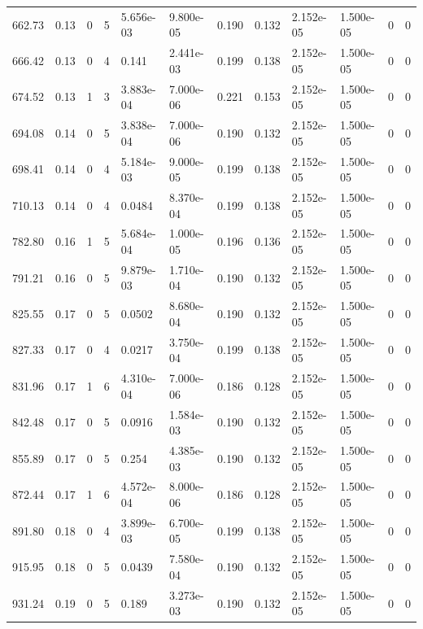 \documentclass[preview]{standalone}
\begin{document}
{{{\begin{tabular}{L{1.2cm}C{1.2cm} C{0.3cm}C{0.5cm} C{1.4cm}C{1.4cm} C{1.4cm}C{1.4cm} C{1.6cm}C{1.6cm} C{1.6cm}C{1.6cm}}
  662.73  &  0.13  & 0     &  5 &  5.656e-03  & 9.800e-05  &  0.190&   0.132& 2.152e-05 & 1.500e-05   &  0 & 0  \\ 
  666.42  &  0.13  & 0     &  4 &  0.141  & 2.441e-03  &  0.199&   0.138& 2.152e-05 & 1.500e-05   &  0 & 0  \\ 
  674.52  &  0.13  & 1     &  3 &  3.883e-04  & 7.000e-06  &  0.221&   0.153& 2.152e-05 & 1.500e-05   &  0 & 0  \\ 
  694.08  &  0.14  & 0     &  5 &  3.838e-04  & 7.000e-06  &  0.190&   0.132& 2.152e-05 & 1.500e-05   &  0 & 0  \\ 
  698.41  &  0.14  & 0     &  4 &  5.184e-03  & 9.000e-05  &  0.199&   0.138& 2.152e-05 & 1.500e-05   &  0 & 0  \\ 
  710.13  &  0.14  & 0     &  4 &  0.0484  & 8.370e-04  &  0.199&   0.138& 2.152e-05 & 1.500e-05   &  0 & 0  \\ 
  782.80  &  0.16  & 1     &  5 &  5.684e-04  & 1.000e-05  &  0.196&   0.136& 2.152e-05 & 1.500e-05   &  0 & 0  \\ 
  791.21  &  0.16  & 0     &  5 &  9.879e-03  & 1.710e-04  &  0.190&   0.132& 2.152e-05 & 1.500e-05   &  0 & 0  \\ 
  825.55  &  0.17  & 0     &  5 &  0.0502  & 8.680e-04  &  0.190&   0.132& 2.152e-05 & 1.500e-05   &  0 & 0  \\ 
  827.33  &  0.17  & 0     &  4 &  0.0217  & 3.750e-04  &  0.199&   0.138& 2.152e-05 & 1.500e-05   &  0 & 0  \\ 
  831.96  &  0.17  & 1     &  6 &  4.310e-04  & 7.000e-06  &  0.186&   0.128& 2.152e-05 & 1.500e-05   &  0 & 0  \\ 
  842.48  &  0.17  & 0     &  5 &  0.0916  & 1.584e-03  &  0.190&   0.132& 2.152e-05 & 1.500e-05   &  0 & 0  \\ 
  855.89  &  0.17  & 0     &  5 &  0.254  & 4.385e-03  &  0.190&   0.132& 2.152e-05 & 1.500e-05   &  0 & 0  \\ 
  872.44  &  0.17  & 1     &  6 &  4.572e-04  & 8.000e-06  &  0.186&   0.128& 2.152e-05 & 1.500e-05   &  0 & 0  \\ 
  891.80  &  0.18  & 0     &  4 &  3.899e-03  & 6.700e-05  &  0.199&   0.138& 2.152e-05 & 1.500e-05   &  0 & 0  \\ 
  915.95  &  0.18  & 0     &  5 &  0.0439  & 7.580e-04  &  0.190&   0.132& 2.152e-05 & 1.500e-05   &  0 & 0  \\ 
  931.24  &  0.19  & 0     &  5 &  0.189  & 3.273e-03  &  0.190&   0.132& 2.152e-05 & 1.500e-05   &  0 & 0  \\ 

\end{tabular}}}}
\end{document}
